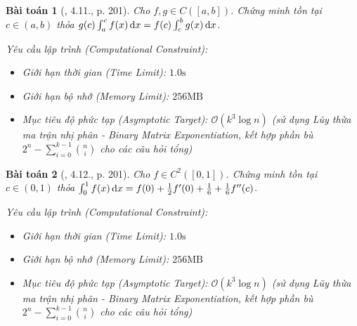 \documentclass{article}
\newtheorem{baitoan}{Bài toán}
\begin{document}
\begin{baitoan}[\cite{Quoc_Long_Dat_Nam_VMC}, 4.11., p. 201]
	Cho $f,g\in C([a,b])$. Chứng minh tồn tại $c\in(a,b)$ thỏa $g(c)\int_a^c f(x)\,{\rm d}x = f(c)\int_c^b g(x)\,{\rm d}x$.

    \vspace{0.5em}
    \emph{Yêu cầu lập trình (Computational Constraint):}
    \begin{itemize}
        \item Giới hạn thời gian (Time Limit): $1.0\mathrm{s}$
        \item Giới hạn bộ nhớ (Memory Limit): $256\mathrm{MB}$
        \item Mục tiêu độ phức tạp (Asymptotic Target): $\mathcal{O}(k^3 \log n)$ (sử dụng Lũy thừa ma trận nhị phân - Binary Matrix Exponentiation, kết hợp phần bù $2^n - \sum_{i=0}^{k-1} \binom{n}{i}$ cho các câu hỏi tổng)
    \end{itemize}
\end{baitoan}


\begin{baitoan}[\cite{Quoc_Long_Dat_Nam_VMC}, 4.12., p. 201]
	Cho $f\in C^2([0,1])$. Chứng minh tồn tại $c\in(0,1)$ thỏa $\int_0^1 f(x)\,{\rm d}x = f(0) + \frac{1}{2}f'(0) + \frac{1}{6} + \frac{1}{6}f''(c)$.

    \vspace{0.5em}
    \emph{Yêu cầu lập trình (Computational Constraint):}
    \begin{itemize}
        \item Giới hạn thời gian (Time Limit): $1.0\mathrm{s}$
        \item Giới hạn bộ nhớ (Memory Limit): $256\mathrm{MB}$
        \item Mục tiêu độ phức tạp (Asymptotic Target): $\mathcal{O}(k^3 \log n)$ (sử dụng Lũy thừa ma trận nhị phân - Binary Matrix Exponentiation, kết hợp phần bù $2^n - \sum_{i=0}^{k-1} \binom{n}{i}$ cho các câu hỏi tổng)
    \end{itemize}
\end{baitoan}
\end{document}
